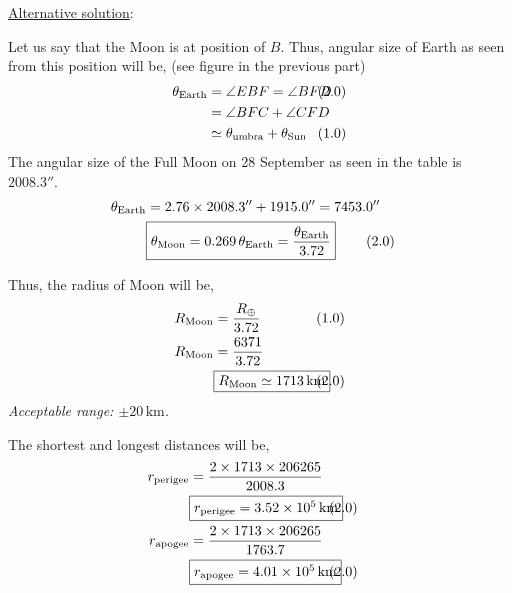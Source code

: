 \begin{description}
\underline{Alternative solution}:

Let us say that the Moon is at position of $B$. Thus, angular size of Earth as seen from
this position will be, (see figure in the previous part)
\begin{align*}
\theta_{\mathrm{Earth}} &= \angle EBF = \angle BFD & &\hspace{-2em}(2.0)\\
 &= \angle BFC + \angle CFD\\
 &\simeq \theta_{\mathrm{umbra}} + \theta_{\mathrm{Sun}} & &\hspace{-2em}(1.0)
\end{align*}
The angular size of the Full Moon on 28 September as seen in the table is $2008.3''$.
\begin{align*}
\theta_{\mathrm{Earth}} &= 2.76\times2008.3'' + 1915.0'' = 7453.0''\\
&\fbox{$\theta_{\mathrm{Moon}} = 0.269\,\theta_{\mathrm{Earth}}
 = \dfrac{\theta_{\mathrm{Earth}}}{3.72}$}
 & &\hspace{-2em}(2.0)
\end{align*}

\item[(D2.7)]
Thus, the radius of Moon will be,
\begin{align*}
R_{\mathrm{Moon}} &= \frac{R_\oplus}{3.72} & &\hspace{-2em}(1.0)\\
R_{\mathrm{Moon}} &= \frac{6371}{3.72}\\
&\fbox{$R_{\mathrm{Moon}} \simeq 1713\,\mathrm{km}$} & &\hspace{-2em}(2.0)
\end{align*}
\emph{Acceptable range: $\pm20\,\mathrm{km}$.}

\item[(D2.8)]
The shortest and longest distances will be,
\begin{align*}
r_{\mathrm{perigee}} &= \frac{2\times1713\times206265}{2008.3}\\
&\fbox{$r_{\mathrm{perigee}} = 3.52\times10^5\,\mathrm{km}$} & &\hspace{-2em}(2.0)\\
r_{\mathrm{apogee}} &= \frac{2\times1713\times206265}{1763.7}\\
&\fbox{$r_{\mathrm{apogee}} = 4.01\times10^5\,\mathrm{km}$} & &\hspace{-2em}(2.0)
\end{align*}


\end{description}
